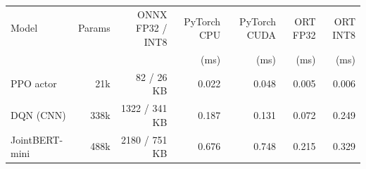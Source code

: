\begin{tabular}{lrrrrrr}
\toprule
Model & Params & ONNX FP32 / INT8 & PyTorch CPU & PyTorch CUDA & ORT FP32 & ORT INT8 \\
 & & & (ms) & (ms) & (ms) & (ms) \\
\midrule
PPO actor & 21k & 82 / 26 KB & 0.022 & 0.048 & 0.005 & 0.006 \\
DQN (CNN) & 338k & 1322 / 341 KB & 0.187 & 0.131 & 0.072 & 0.249 \\
JointBERT-mini & 488k & 2180 / 751 KB & 0.676 & 0.748 & 0.215 & 0.329 \\
\bottomrule
\end{tabular}
